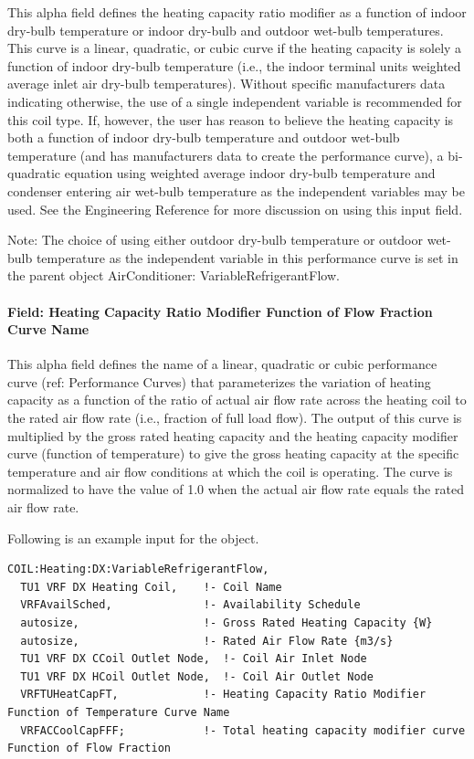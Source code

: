This alpha field defines the heating capacity ratio modifier as a function of indoor dry-bulb temperature or indoor dry-bulb and outdoor wet-bulb temperatures. This curve is a linear, quadratic, or cubic curve if the heating capacity is solely a function of indoor dry-bulb temperature (i.e., the indoor terminal units weighted average inlet air dry-bulb temperatures). Without specific manufacturers data indicating otherwise, the use of a single independent variable is recommended for this coil type. If, however, the user has reason to believe the heating capacity is both a function of indoor dry-bulb temperature and outdoor wet-bulb temperature (and has manufacturers data to create the performance curve), a bi-quadratic equation using weighted average indoor dry-bulb temperature and condenser entering air wet-bulb temperature as the independent variables may be used. See the Engineering Reference for more discussion on using this input field.

Note: The choice of using either outdoor dry-bulb temperature or outdoor wet-bulb temperature as the independent variable in this performance curve is set in the parent object AirConditioner: VariableRefrigerantFlow.

\paragraph{Field: Heating Capacity Ratio Modifier Function of Flow Fraction Curve Name}\label{field-heating-capacity-ratio-modifier-function-of-flow-fraction-curve-name}

This alpha field defines the name of a linear, quadratic or cubic performance curve (ref: Performance Curves) that parameterizes the variation of heating capacity as a function of the ratio of actual air flow rate across the heating coil to the rated air flow rate (i.e., fraction of full load flow). The output of this curve is multiplied by the gross rated heating capacity and the heating capacity modifier curve (function of temperature) to give the gross heating capacity at the specific temperature and air flow conditions at which the coil is operating. The curve is normalized to have the value of 1.0 when the actual air flow rate equals the rated air flow rate.

Following is an example input for the object.

\begin{lstlisting}
COIL:Heating:DX:VariableRefrigerantFlow,
  TU1 VRF DX Heating Coil,    !- Coil Name
  VRFAvailSched,              !- Availability Schedule
  autosize,                   !- Gross Rated Heating Capacity {W}
  autosize,                   !- Rated Air Flow Rate {m3/s}
  TU1 VRF DX CCoil Outlet Node,  !- Coil Air Inlet Node
  TU1 VRF DX HCoil Outlet Node,  !- Coil Air Outlet Node
  VRFTUHeatCapFT,             !- Heating Capacity Ratio Modifier Function of Temperature Curve Name
  VRFACCoolCapFFF;            !- Total heating capacity modifier curve Function of Flow Fraction
\end{lstlisting}

